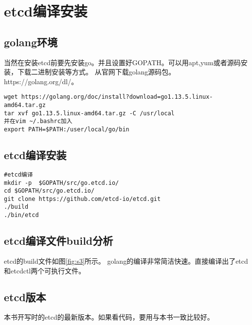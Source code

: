 
\mylineskip
\chapter{etcd编译安装}\label{chaper:ch1}
\section{golang环境}
当然在安装etcd前要先安装go。并且设置好GOPATH。可以用apt,yum或者源码安装，下载二进制安装等方式。
从官网下载golang源码包。https://golang.org/dl/。

\begin{verbatim}
wget https://golang.org/doc/install?download=go1.13.5.linux-amd64.tar.gz
tar xvf go1.13.5.linux-amd64.tar.gz -C /usr/local
并在vim ~/.bashrc加入
export PATH=$PATH:/user/local/go/bin
\end{verbatim}


\section{etcd编译安装}
\begin{verbatim}
#etcd编译
mkdir -p  $GOPATH/src/go.etcd.io/
cd $GOPATH/src/go.etcd.io/
git clone https://github.com/etcd-io/etcd.git
./build
./bin/etcd
\end{verbatim}


\section{etcd编译文件build分析}
	etcd的build文件如图\ref{fig:s3}所示。 golang的编译非常简洁快速。直接编译出了etcd和etcdctl两个可执行文件。


\section{etcd版本}
	本书开写时的etcd的最新版本。如果看代码，要用与本书一致比较好。
